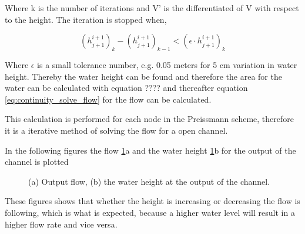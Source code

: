 Where k is the number of iterations and V' is the differentiated of V with respect to the height. The iteration is stopped when,

\begin{equation}
	(h_{j+1}^{i+1})_{k}-(h_{j+1}^{i+1})_{k-1} < (\epsilon \cdot h_{j+1}^{i+1})_{k}
\end{equation}

Where $\epsilon$ is a small tolerance number, e.g. 0.05 meters for 5 cm variation in water height. Thereby the water height can be found and therefore the area for the water can be calculated with equation ????  and thereafter equation \ref{eq:continuity_solve_flow} for the flow can be calculated.  

This calculation is performed for each node in the Preissmann scheme, therefore it is a iterative method of solving the flow for a open channel. 


In the following figures the flow \ref{fig:simulation_output_flow_height}a and the water height \ref{fig:simulation_output_flow_height}b for the output of the channel is plotted


\begin{figure}[H]
\centering
\begin{subfigure}{.5\textwidth}
  \centering
  
  \caption{}
\end{subfigure}%
\begin{subfigure}{.4\textwidth}
  \centering
 
  \caption{}
\end{subfigure}
\caption{(a) Output flow, (b) the water height at the output of the channel.}
\label{fig:simulation_output_flow_height}
\end{figure}

These figures shows that whether the height is increasing or decreasing the flow is following, which is what is expected, because a higher water level will result in a higher flow rate and vice versa. 
